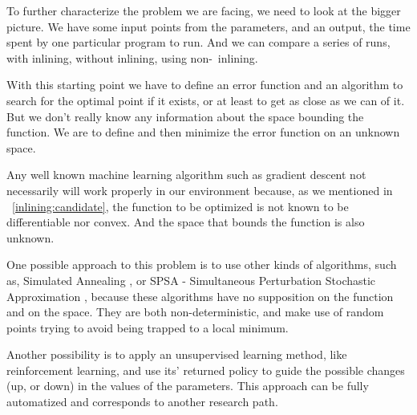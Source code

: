 

To further characterize the problem we are facing, we need to look at
the bigger picture. We have some input points from the parameters, and
an output, the time spent by one particular program to run. And we can
compare a series of runs, with inlining, without inlining, using non-\FDO\
inlining.

With this starting point we have to define an error function and an algorithm
to search for the optimal point if it exists, or at least to get as close as
we can of it. But we don't really know any information about the space bounding
the function. We are to define and then minimize the error function on an
unknown space.

Any well known machine learning algorithm such as gradient descent
not necessarily will work properly in our environment because, as
we mentioned in ~\ref{inlining:candidate}, the function to be optimized
is not known to be differentiable nor convex. And the space that bounds
the function is also unknown.

One possible approach to this problem is to use other kinds of algorithms,
such as, Simulated Annealing \cite{Zhong2009}, or SPSA - Simultaneous Perturbation Stochastic
Approximation \cite{Spall1999,Spall2012}, because these algorithms have no
supposition on the function and on the space. They are both non-deterministic,
and make use of random points trying to avoid being trapped to a local minimum.

Another possibility is to apply an unsupervised learning method, like reinforcement
learning, and use its' returned policy to guide the possible changes (up, or down)
in the values of the parameters. This approach can be fully automatized and corresponds
to another research path.
